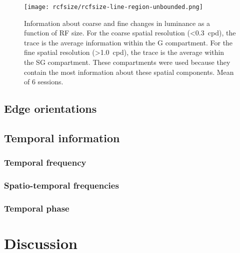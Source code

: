 

\begin{figure}[htb]
    \centering
    \texttt{[image: rcfsize/rcfsize-line-region-unbounded.png]}
    \caption{
Information about coarse and fine changes in luminance as a function of \ac{RF} size.
For the coarse spatial resolution (\SI{<0.3}{cpd}), the trace is the average information within the \ac{G} compartment.
For the fine spatial resolution (\SI{>1.0}{cpd}), the trace is the average within the \ac{SG} compartment.
These compartments were used because they contain the most information about these spatial components.
Mean of 6 sessions.
}
\label{fig:lam_rcfsize_trace}
\end{figure}

\subsection{Edge orientations}


\subsection{Temporal information}


\subsubsection{Temporal frequency}


\subsubsection{Spatio-temporal frequencies}


\subsubsection{Temporal phase}


\section{Discussion}
